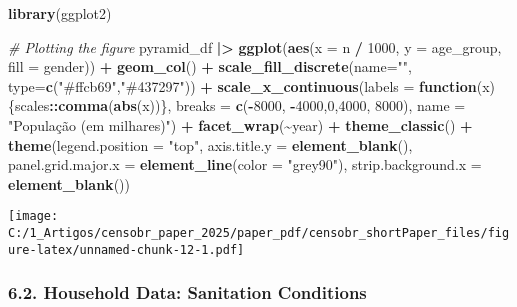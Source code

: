 \documentclass[
]{article}
\newenvironment{Shaded}{\begin{snugshade}}{\end{snugshade}}
\newcommand{\AttributeTok}[1]{\textcolor[rgb]{0.13,0.29,0.53}{#1}}
\newcommand{\CommentTok}[1]{\textcolor[rgb]{0.56,0.35,0.01}{\textit{#1}}}
\newcommand{\ControlFlowTok}[1]{\textcolor[rgb]{0.13,0.29,0.53}{\textbf{#1}}}
\newcommand{\DecValTok}[1]{\textcolor[rgb]{0.00,0.00,0.81}{#1}}
\newcommand{\FunctionTok}[1]{\textcolor[rgb]{0.13,0.29,0.53}{\textbf{#1}}}
\newcommand{\NormalTok}[1]{#1}
\newcommand{\SpecialCharTok}[1]{\textcolor[rgb]{0.81,0.36,0.00}{\textbf{#1}}}
\newcommand{\StringTok}[1]{\textcolor[rgb]{0.31,0.60,0.02}{#1}}
\begin{document}
\begin{Shaded}
\begin{Highlighting}[]
\FunctionTok{library}\NormalTok{(ggplot2)}

\CommentTok{\# Plotting the figure}
\NormalTok{pyramid\_df }\SpecialCharTok{|\textgreater{}}
        \FunctionTok{ggplot}\NormalTok{(}\FunctionTok{aes}\NormalTok{(}\AttributeTok{x =}\NormalTok{ n }\SpecialCharTok{/} \DecValTok{1000}\NormalTok{,}
                   \AttributeTok{y =}\NormalTok{ age\_group,}
                   \AttributeTok{fill =}\NormalTok{ gender)) }\SpecialCharTok{+}
        \FunctionTok{geom\_col}\NormalTok{() }\SpecialCharTok{+}
        \FunctionTok{scale\_fill\_discrete}\NormalTok{(}\AttributeTok{name=}\StringTok{""}\NormalTok{, }\AttributeTok{type=}\FunctionTok{c}\NormalTok{(}\StringTok{"\#ffcb69"}\NormalTok{,}\StringTok{"\#437297"}\NormalTok{)) }\SpecialCharTok{+}       
        \FunctionTok{scale\_x\_continuous}\NormalTok{(}\AttributeTok{labels =} \ControlFlowTok{function}\NormalTok{(x)\{scales}\SpecialCharTok{::}\FunctionTok{comma}\NormalTok{(}\FunctionTok{abs}\NormalTok{(x))\},}
                           \AttributeTok{breaks =} \FunctionTok{c}\NormalTok{(}\SpecialCharTok{{-}}\DecValTok{8000}\NormalTok{, }\SpecialCharTok{{-}}\DecValTok{4000}\NormalTok{,}\DecValTok{0}\NormalTok{,}\DecValTok{4000}\NormalTok{, }\DecValTok{8000}\NormalTok{),}
                           \AttributeTok{name =} \StringTok{"População (em milhares)"}\NormalTok{) }\SpecialCharTok{+}
        \FunctionTok{facet\_wrap}\NormalTok{(}\SpecialCharTok{\textasciitilde{}}\NormalTok{year) }\SpecialCharTok{+}
        \FunctionTok{theme\_classic}\NormalTok{() }\SpecialCharTok{+}
        \FunctionTok{theme}\NormalTok{(}\AttributeTok{legend.position =} \StringTok{"top"}\NormalTok{,}
              \AttributeTok{axis.title.y =} \FunctionTok{element\_blank}\NormalTok{(),}
              \AttributeTok{panel.grid.major.x =} \FunctionTok{element\_line}\NormalTok{(}\AttributeTok{color =} \StringTok{"grey90"}\NormalTok{), }
              \AttributeTok{strip.background.x =} \FunctionTok{element\_blank}\NormalTok{()) }
\end{Highlighting}
\end{Shaded}

\texttt{[image: C:/1\_Artigos/censobr\_paper\_2025/paper\_pdf/censobr\_shortPaper\_files/figure-latex/unnamed-chunk-12-1.pdf]}

\subsubsection{6.2. Household Data: Sanitation
Conditions}\label{household-data-sanitation-conditions}
\end{document}
